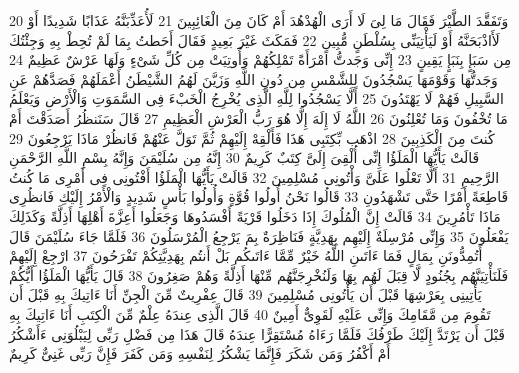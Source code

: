 \documentclass[20pt,a4paper]{article}
\begin{document}
{\tiny\colorbox{cl_aya}{20}} وَتَفَقَّدَ الطَّيْرَ فَقَالَ مَا لِىَ لَا أَرَى الْهُدْهُدَ أَمْ كَانَ مِنَ الْغَائِبِينَ
{\tiny\colorbox{cl_aya}{21}} لَأُعَذِّبَنَّهُ عَذَابًا شَدِيدًا أَوْ لَأَاذْبَحَنَّهُ أَوْ لَيَأْتِيَنِّى بِسُلْطَنٍ مُّبِينٍ
{\tiny\colorbox{cl_aya}{22}} فَمَكَثَ غَيْرَ بَعِيدٍ فَقَالَ أَحَطتُ بِمَا لَمْ تُحِطْ بِهِ وَجِئْتُكَ مِن سَبَإٍ بِنَبَإٍ يَقِينٍ
{\tiny\colorbox{cl_aya}{23}} إِنِّى وَجَدتُّ امْرَأَةً تَمْلِكُهُمْ وَأُوتِيَتْ مِن كُلِّ شَىْءٍ وَلَهَا عَرْشٌ عَظِيمٌ
{\tiny\colorbox{cl_aya}{24}} وَجَدتُّهَا وَقَوْمَهَا يَسْجُدُونَ لِلشَّمْسِ مِن دُونِ اللَّهِ وَزَيَّنَ لَهُمُ الشَّيْطَنُ أَعْمَلَهُمْ فَصَدَّهُمْ عَنِ السَّبِيلِ فَهُمْ لَا يَهْتَدُونَ
{\tiny\colorbox{cl_aya}{25}} أَلَّا يَسْجُدُوا لِلَّهِ الَّذِى يُخْرِجُ الْخَبْءَ فِى السَّمَوَتِ وَالْأَرْضِ وَيَعْلَمُ مَا تُخْفُونَ وَمَا تُعْلِنُونَ
{\tiny\colorbox{cl_aya}{26}} اللَّهُ لَا إِلَهَ إِلَّا هُوَ رَبُّ الْعَرْشِ الْعَظِيمِ
{\tiny\colorbox{cl_aya}{27}} قَالَ سَنَنظُرُ أَصَدَقْتَ أَمْ كُنتَ مِنَ الْكَذِبِينَ
{\tiny\colorbox{cl_aya}{28}} اذْهَب بِّكِتَبِى هَذَا فَأَلْقِهْ إِلَيْهِمْ ثُمَّ تَوَلَّ عَنْهُمْ فَانظُرْ مَاذَا يَرْجِعُونَ
{\tiny\colorbox{cl_aya}{29}} قَالَتْ يَأَيُّهَا الْمَلَؤُا إِنِّى أُلْقِىَ إِلَىَّ كِتَبٌ كَرِيمٌ
{\tiny\colorbox{cl_aya}{30}} إِنَّهُ مِن سُلَيْمَنَ وَإِنَّهُ بِسْمِ اللَّهِ الرَّحْمَنِ الرَّحِيمِ
{\tiny\colorbox{cl_aya}{31}} أَلَّا تَعْلُوا عَلَىَّ وَأْتُونِى مُسْلِمِينَ
{\tiny\colorbox{cl_aya}{32}} قَالَتْ يَأَيُّهَا الْمَلَؤُا أَفْتُونِى فِى أَمْرِى مَا كُنتُ قَاطِعَةً أَمْرًا حَتَّى تَشْهَدُونِ
{\tiny\colorbox{cl_aya}{33}} قَالُوا نَحْنُ أُولُوا قُوَّةٍ وَأُولُوا بَأْسٍ شَدِيدٍ وَالْأَمْرُ إِلَيْكِ فَانظُرِى مَاذَا تَأْمُرِينَ
{\tiny\colorbox{cl_aya}{34}} قَالَتْ إِنَّ الْمُلُوكَ إِذَا دَخَلُوا قَرْيَةً أَفْسَدُوهَا وَجَعَلُوا أَعِزَّةَ أَهْلِهَا أَذِلَّةً وَكَذَلِكَ يَفْعَلُونَ
{\tiny\colorbox{cl_aya}{35}} وَإِنِّى مُرْسِلَةٌ إِلَيْهِم بِهَدِيَّةٍ فَنَاظِرَةٌ بِمَ يَرْجِعُ الْمُرْسَلُونَ
{\tiny\colorbox{cl_aya}{36}} فَلَمَّا جَاءَ سُلَيْمَنَ قَالَ أَتُمِدُّونَنِ بِمَالٍ فَمَا ءَاتَىنِ اللَّهُ خَيْرٌ مِّمَّا ءَاتَىكُم بَلْ أَنتُم بِهَدِيَّتِكُمْ تَفْرَحُونَ
{\tiny\colorbox{cl_aya}{37}} ارْجِعْ إِلَيْهِمْ فَلَنَأْتِيَنَّهُم بِجُنُودٍ لَّا قِبَلَ لَهُم بِهَا وَلَنُخْرِجَنَّهُم مِّنْهَا أَذِلَّةً وَهُمْ صَغِرُونَ
{\tiny\colorbox{cl_aya}{38}} قَالَ يَأَيُّهَا الْمَلَؤُا أَيُّكُمْ يَأْتِينِى بِعَرْشِهَا قَبْلَ أَن يَأْتُونِى مُسْلِمِينَ
{\tiny\colorbox{cl_aya}{39}} قَالَ عِفْرِيتٌ مِّنَ الْجِنِّ أَنَا ءَاتِيكَ بِهِ قَبْلَ أَن تَقُومَ مِن مَّقَامِكَ وَإِنِّى عَلَيْهِ لَقَوِىٌّ أَمِينٌ
{\tiny\colorbox{cl_aya}{40}} قَالَ الَّذِى عِندَهُ عِلْمٌ مِّنَ الْكِتَبِ أَنَا ءَاتِيكَ بِهِ قَبْلَ أَن يَرْتَدَّ إِلَيْكَ طَرْفُكَ فَلَمَّا رَءَاهُ مُسْتَقِرًّا عِندَهُ قَالَ هَذَا مِن فَضْلِ رَبِّى لِيَبْلُوَنِى ءَأَشْكُرُ أَمْ أَكْفُرُ وَمَن شَكَرَ فَإِنَّمَا يَشْكُرُ لِنَفْسِهِ وَمَن كَفَرَ فَإِنَّ رَبِّى غَنِىٌّ كَرِيمٌ
\end{document}
